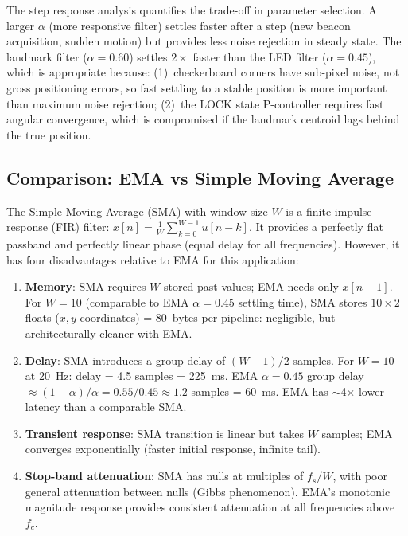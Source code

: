 The step response analysis quantifies the trade-off in parameter selection. A larger $\alpha$ (more responsive filter) settles faster after a step (new beacon acquisition, sudden motion) but provides less noise rejection in steady state. The landmark filter ($\alpha=0.60$) settles $2\times$ faster than the LED filter ($\alpha=0.45$), which is appropriate because: (1)~checkerboard corners have sub-pixel noise, not gross positioning errors, so fast settling to a stable position is more important than maximum noise rejection; (2)~the LOCK state P-controller requires fast angular convergence, which is compromised if the landmark centroid lags behind the true position.

\subsection{Comparison: EMA vs Simple Moving Average}

The Simple Moving Average (SMA) with window size $W$ is a finite impulse response (FIR) filter: $x[n] = \frac{1}{W}\sum_{k=0}^{W-1} u[n-k]$. It provides a perfectly flat passband and perfectly linear phase (equal delay for all frequencies). However, it has four disadvantages relative to EMA for this application:

\begin{enumerate}[leftmargin=1.6em]
  \item \textbf{Memory}: SMA requires $W$ stored past values; EMA needs only $x[n-1]$. For $W=10$ (comparable to EMA $\alpha=0.45$ settling time), SMA stores $10\times2$ floats ($x,y$ coordinates) = 80~bytes per pipeline: negligible, but architecturally cleaner with EMA.
  \item \textbf{Delay}: SMA introduces a group delay of $(W-1)/2$ samples. For $W=10$ at 20~Hz: delay = 4.5 samples = 225~ms. EMA $\alpha=0.45$ group delay $\approx (1-\alpha)/\alpha = 0.55/0.45 \approx 1.2$ samples = 60~ms. EMA has $\sim$4$\times$ lower latency than a comparable SMA.
  \item \textbf{Transient response}: SMA transition is linear but takes $W$ samples; EMA converges exponentially (faster initial response, infinite tail).
  \item \textbf{Stop-band attenuation}: SMA has nulls at multiples of $f_s/W$, with poor general attenuation between nulls (Gibbs phenomenon). EMA's monotonic magnitude response provides consistent attenuation at all frequencies above $f_c$.
\end{enumerate}

